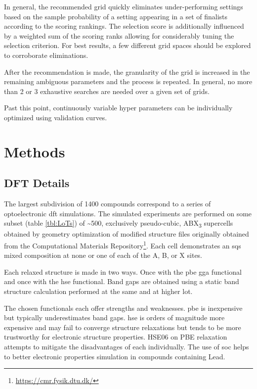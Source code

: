 \documentclass[aip, jmp, amsmath, amssymb, nofootinbib]{revtex4-2}
\begin{document}
In general, the recommended grid quickly eliminates under-performing
settings based on the sample probability of a setting appearing in a
set of finalists according to the scoring rankings. The selection
score is additionally influenced by a weighted sum of the scoring
ranks allowing for considerably tuning the selection criterion.  For
best results, a few different grid spaces should be explored to
corroborate eliminations.

After the recommendation is made, the granularity of the grid is
increased in the remaining ambiguous parameters and the process is
repeated. In general, no more than 2 or 3 exhaustive searches are
needed over a given set of grids.

Past this point, continuously variable hyper parameters can be
individually optimized using validation curves.

\section*{Methods}
\label{sec:org7884545}
\subsection*{DFT Details}
\label{sec:orgb909428}
The largest subdivision of 1400 compounds correspond to a series of
optoelectronic \acrshort{dft} simulations. The simulated experiments are
performed on some subset (table \ref{tbl:LoTs}) of \textasciitilde{}500, exclusively
pseudo-cubic, ABX\textsubscript{3} supercells obtained by geometry optimization of
modified structure files \cite{pilania-2016-machin-learn} originally
obtained from the Computational Materials Repository\footnote{\url{https://cmr.fysik.dtu.dk/}}. Each cell
demonstrates an \acrshort{sqs} mixed composition at none or one of each of the A,
B, or X sites.

Each relaxed structure is made in two ways. Once with the \acrshort{pbe} \acrshort{gga}
functional and once with the \acrshort{hse} functional. Band gaps are obtained
using a static band structure calculation performed at the same and at
higher \gls{lot}.

The chosen functionals each offer strengths and weaknesses. \acrshort{pbe} is
inexpensive but typically underestimates band gaps. \acrshort{hse} is orders of
magnitude more expensive and may fail to converge structure
relaxations but tends to be more trustworthy for electronic structure
properties. HSE06 on PBE relaxation attempts to mitigate the
disadvantages of each individually. The use of \gls{soc}
helps to better electronic properties simulation in compounds
containing Lead.
\end{document}
